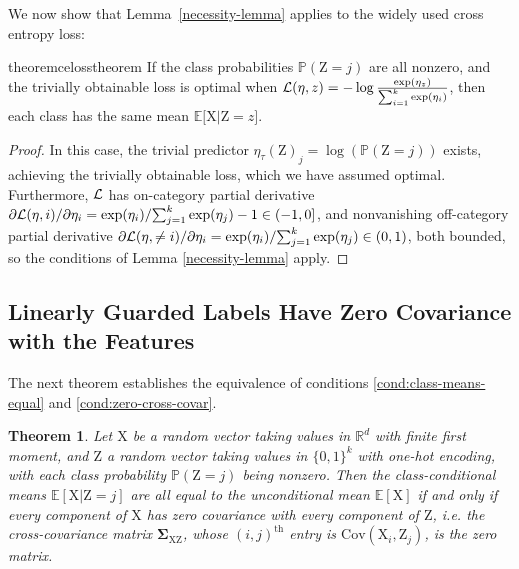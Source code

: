 \documentclass{article}
\theoremstyle{plain}
\newtheorem{theorem}{Theorem}[section]
\theoremstyle{remark}
\newcommand{\sxz}{\mathbf \Sigma_{\rv X \rv Z}}
\newcommand{\E}{\mathbb E}
\theoremstyle{plain}
\theoremstyle{TheoremNum}
\newcommand{\rv}[1]{{\mathrm{#1}}}
\newcommand{\loss}{\color{black} \mathcal{L}}
\begin{document}
We now show that Lemma~\ref{necessity-lemma} applies to the widely used cross entropy loss:

\begin{restatable}{theorem}{celosstheorem}\label{ce-loss-theorem}
    If the class probabilities $\mathbb P(\rv Z = j)$ are all nonzero, and the trivially obtainable loss is optimal when $\loss(\eta, z) = - \log \frac {\exp(\eta_z)} {\sum_{i=1}^k \exp(\eta_i)}$, then each class has the same mean $\E\big[\rv X \big| \rv Z = z\big]$.
\end{restatable}

\begin{proof}
    In this case, the trivial predictor ${\eta_\tau(\rv Z)}_j = \log(\mathbb P(\rv Z = j))$ exists, achieving the trivially obtainable loss, which we have assumed optimal. Furthermore, $\loss$ has on-category partial derivative ${\partial \loss(\eta, i)}/{\partial \eta_i} = {\exp(\eta_i)}/{\sum_{j=1}^k \exp(\eta_j)} - 1 \in (-1, 0]$, and nonvanishing off-category partial derivative ${\partial \loss(\eta, \neq i)}/{\partial \eta_i} = {\exp(\eta_i)}/{\sum_{j=1}^k \exp(\eta_j)} \in (0, 1)$, both bounded, so the conditions of Lemma \ref{necessity-lemma} apply.
\end{proof}


\subsection{Linearly Guarded Labels Have Zero Covariance with the Features}\label{sec:zero-covariance}

The next theorem establishes the equivalence of conditions \ref{cond:class-means-equal} and \ref{cond:zero-cross-covar}.

\begin{theorem}\label{zero-covariance}
    Let $\rv X$ be a random vector taking values in $\mathbb R^d$ with finite first moment, and $\rv Z$ a random vector taking values in $\{0, 1\}^k$ with one-hot encoding, with each class probability $\mathbb P(\rv Z = j)$ being nonzero. Then the class-conditional means $\E[\rv X | \rv Z = j]$ are all equal to the unconditional mean $\E[\rv X]$ if and only if every component of $\rv X$ has zero covariance with every component of $\rv Z$, i.e. the cross-covariance matrix $\sxz$, whose $(i, j)^\text{th}$ entry is $\mathrm{Cov}(\rv X_i, \rv Z_j)$, is the zero matrix.
\end{theorem}
\end{document}
